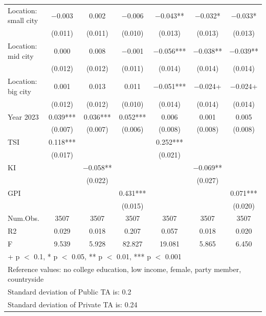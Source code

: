\documentclass[
  letterpaper,
  DIV=11,
  numbers=noendperiod]{scrartcl}
\begin{document}
\begin{table}[H]
{\begin{tabular}[t]{lcccccc}
Location: small city & \num{-0.003} & \num{0.002} & \num{-0.006} & \num{-0.043}** & \num{-0.032}* & \num{-0.033}*\\
 & (\num{0.011}) & (\num{0.011}) & (\num{0.010}) & (\num{0.013}) & (\num{0.013}) & (\num{0.013})\\
Location: mid city & \num{0.000} & \num{0.008} & \num{-0.001} & \num{-0.056}*** & \num{-0.038}** & \num{-0.039}**\\
 & (\num{0.012}) & (\num{0.012}) & (\num{0.011}) & (\num{0.014}) & (\num{0.014}) & (\num{0.014})\\
Location: big city & \num{0.001} & \num{0.013} & \num{0.011} & \num{-0.051}*** & \num{-0.024}+ & \num{-0.024}+\\
 & (\num{0.012}) & (\num{0.012}) & (\num{0.010}) & (\num{0.014}) & (\num{0.014}) & (\num{0.014})\\
Year 2023 & \num{0.039}*** & \num{0.036}*** & \num{0.052}*** & \num{0.006} & \num{0.001} & \num{0.005}\\
 & (\num{0.007}) & (\num{0.007}) & (\num{0.006}) & (\num{0.008}) & (\num{0.008}) & (\num{0.008})\\
TSI & \num{0.118}*** &  &  & \num{0.252}*** &  & \\
 & (\num{0.017}) &  &  & (\num{0.021}) &  & \\
KI &  & \num{-0.058}** &  &  & \num{-0.069}** & \\
 &  & (\num{0.022}) &  &  & (\num{0.027}) & \\
GPI &  &  & \num{0.431}*** &  &  & \num{0.071}***\\
 &  &  & (\num{0.015}) &  &  & (\num{0.020})\\
\midrule
Num.Obs. & \num{3507} & \num{3507} & \num{3507} & \num{3507} & \num{3507} & \num{3507}\\
R2 & \num{0.029} & \num{0.018} & \num{0.207} & \num{0.057} & \num{0.018} & \num{0.020}\\
F & \num{9.539} & \num{5.928} & \num{82.827} & \num{19.081} & \num{5.865} & \num{6.450}\\
\bottomrule
\multicolumn{7}{l}{\rule{0pt}{1em}+ p $<$ 0.1, * p $<$ 0.05, ** p $<$ 0.01, *** p $<$ 0.001}\\
\multicolumn{7}{l}{\rule{0pt}{1em}Reference values: no college education, low income, female, party member, countryside}\\
\multicolumn{7}{l}{\rule{0pt}{1em}Standard deviation of Public TA is:  0.2}\\
\multicolumn{7}{l}{\rule{0pt}{1em}Standard deviation of Private TA is:  0.24}\\
\end{tabular}

}

\end{table}%
\end{document}
